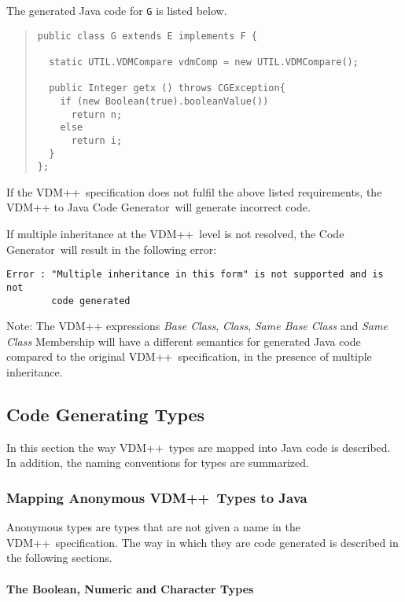 \documentclass[\pformat,11pt]{article}
\newcommand{\tcg}{the Code Generator}
\newcommand{\VDM}{VDM++}
\newcommand{\cg}{VDM++ to Java Code Generator}
\begin{document}
The generated Java code for \texttt{G} is listed below.

\begin{quote}
\begin{small}
\begin{verbatim}
public class G extends E implements F {

  static UTIL.VDMCompare vdmComp = new UTIL.VDMCompare();

  public Integer getx () throws CGException{
    if (new Boolean(true).booleanValue()) 
      return n;
    else 
      return i;
  }
};
\end{verbatim}
\end{small}
\end{quote}

If the \VDM\ specification does not fulfil the above listed
requirements, the \cg\ will generate incorrect code.

If multiple inheritance at the \VDM\ level is not resolved, \tcg\
will result in the following error: 
\begin{verbatim}
Error : "Multiple inheritance in this form" is not supported and is not 
        code generated
\end{verbatim}

Note: The VDM++ expressions {\em Base Class}, {\em Class}, {\em Same
Base Class} and {\em Same Class} Membership will have a different
semantics for generated Java code compared to the original \VDM\
specification, in the presence of multiple inheritance.

\subsection{Code Generating Types}
\label{types}
 In this section the way 
\VDM\ types are mapped into Java code is described. 
In addition, the naming conventions for types are summarized.


\subsubsection{Mapping Anonymous \VDM\ Types to Java}

Anonymous types are types that are not given a name in the \VDM\
specification. The way in which they are code generated is described
in the following sections.

\paragraph{The Boolean, Numeric and Character Types}
  
\end{document}
